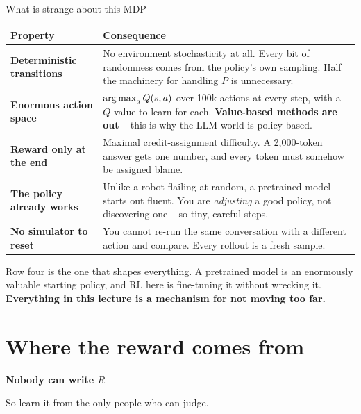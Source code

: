 \documentclass[aspectratio=169]{beamer}
\begin{document}
\begin{frame}{What is strange about this MDP}
  \footnotesize
  \begin{center}
  \begin{tabular}{p{4.2cm} p{8.4cm}}
    \toprule
    \textbf{Property} & \textbf{Consequence} \\
    \midrule
    \textbf{Deterministic transitions} &
      No environment stochasticity at all. Every bit of randomness comes from the policy's own
      sampling. Half the machinery for handling $P$ is unnecessary. \\[4pt]
    \textbf{Enormous action space} &
      $\mathop{\mathrm{arg\,max}}_a Q(s,a)$ over 100k actions at every step, with a $Q$ value to learn for each.
      \textbf{Value-based methods are out} -- this is why the LLM world is policy-based. \\[4pt]
    \textbf{Reward only at the end} &
      Maximal credit-assignment difficulty. A 2{,}000-token answer gets one number, and every
      token must somehow be assigned blame. \\[4pt]
    \textbf{The policy already works} &
      Unlike a robot flailing at random, a pretrained model starts out fluent. You are
      \emph{adjusting} a good policy, not discovering one -- so tiny, careful steps. \\[4pt]
    \textbf{No simulator to reset} &
      You cannot re-run the same conversation with a different action and compare. Every rollout
      is a fresh sample. \\
    \bottomrule
  \end{tabular}
  \end{center}

  \vskip 6pt
  \begin{tcolorbox}[colback=armblue!8, colframe=armblue, boxrule=0.6pt, arc=2pt]
    \footnotesize
    Row four is the one that shapes everything. A pretrained model is an enormously valuable
    starting policy, and RL here is fine-tuning it without wrecking it. \textbf{Everything in
    this lecture is a mechanism for not moving too far.}
  \end{tcolorbox}
\end{frame}

\section{Where the reward comes from}
\begin{frame}[plain]
  \begin{center}
    \vskip 1.6cm
    {\Huge\bfseries\color{popblue}Nobody can write $R$}

    \vskip 0.6cm
    {\large So learn it from the only people who can judge.}
  \end{center}
\end{frame}
\end{document}
